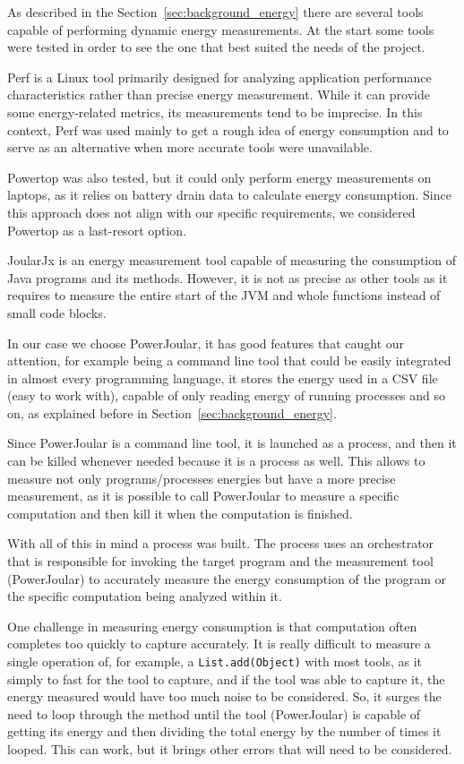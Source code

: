 As described in the Section~\ref{sec:background_energy} there are several tools capable of performing dynamic energy measurements.
At the start some tools were tested in order to see the one that best suited the needs of the project.

Perf is a Linux tool primarily designed for analyzing application performance characteristics rather than precise energy measurement. While it can provide some energy-related metrics, its measurements tend to be imprecise. In this context, Perf was used mainly to get a rough idea of energy consumption and to serve as an alternative when more accurate tools were unavailable.

Powertop was also tested, but it could only perform energy measurements on laptops, as it relies on battery drain data to calculate energy consumption. Since this approach does not align with our specific requirements, we considered Powertop as a last-resort option.

JoularJx is an energy measurement tool capable of measuring the consumption of Java programs and its methods. However, it is not as precise as other tools as it requires to measure the entire start of the JVM and whole functions instead of small code blocks.

In our case we choose PowerJoular, it has good features that caught our attention, for example being a command line tool that could be easily integrated in almost every programming language, it stores the energy used in a CSV file (easy to work with), capable of only reading energy of running processes and so on, as explained before in Section~\ref{sec:background_energy}.

Since PowerJoular is a command line tool, it is launched as a process, and then it can be killed whenever needed because it is a process as well. This allows to measure not only programs/processes energies but have a more precise measurement, as it is possible to call PowerJoular to measure a specific computation and then kill it when the computation is finished.

With all of this in mind a process was built. The process uses an orchestrator that is responsible for invoking the target program and the measurement tool (PowerJoular) to accurately measure the energy consumption of the program or the specific computation being analyzed within it.


One challenge in measuring energy consumption is that computation often completes too quickly to capture accurately. It is really difficult to measure a single operation of, for example, a \texttt{List.add(Object)} with most tools, as it simply to fast for the tool to capture, and if the tool was able to capture it, the energy measured would have too much noise to be considered. So, it surges the need to loop through the method until the tool (PowerJoular) is capable of getting its energy and then dividing the total energy by the number of times it looped. This can work, but it brings other errors that will need to be considered.

